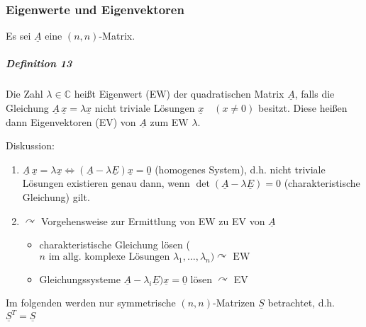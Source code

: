 \documentclass[a4paper]{scrartcl}
\begin{document}
\subsubsection{Eigenwerte und Eigenvektoren}
Es sei $\underline{A}$ eine $(n,n)$-Matrix.

\subparagraph{Definition 13} Die Zahl $\lambda \in \mathbb{C}$ heißt Eigenwert (EW) der quadratischen Matrix $\underline{A}$, falls die Gleichung $\underline{A} \, \underline{x} = \lambda \underline{x}$ nicht triviale Lösungen $\underline{x} \quad (x \neq 0 )$ besitzt. Diese heißen dann Eigenvektoren (EV) von $\underline{A}$ zum EW $\lambda$.

Diskussion:
\begin{enumerate}
\item $\underline{A} \, \underline{x} = \lambda \underline{x} \Leftrightarrow (\underline{A} - \lambda \underline{E} ) \underline{x} = \underline{0}$ (homogenes System), d.h. nicht triviale Lösungen existieren genau dann, wenn $\det{(\underline{A} - \lambda \underline{E} )} = 0$ (charakteristische Gleichung) gilt.\\
\item $\curvearrowright$ Vorgehensweise zur Ermittlung von EW zu EV von $\underline{A}$
\begin{itemize}
\item charakteristische Gleichung lösen ($n \text{ im allg. komplexe Lösungen } \lambda_1 , \dots , \lambda_n ) \curvearrowright \text{ EW}$
\item Gleichungssysteme $\underline{A} - \lambda_i \underline{E} ) \underline{x} = \underline{0}$ lösen $\curvearrowright$ EV
\end{itemize}
\end{enumerate}

Im folgenden werden nur symmetrische $(n,n)$-Matrizen $\underline{S}$ betrachtet, d.h. $\underline{S}^T = \underline{S}$
\end{document}
